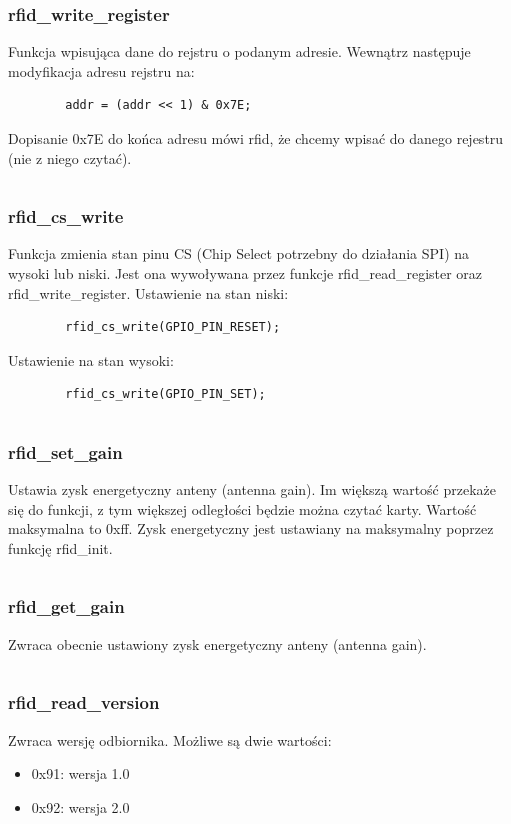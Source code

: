 \documentclass[12pt,hidelinks]{article}
\begin{document}
    \subsubsection{rfid\_write\_register}
    Funkcja wpisująca dane do rejstru o podanym adresie. Wewnątrz następuje modyfikacja adresu rejstru na:
    \begin{verbatim}
        addr = (addr << 1) & 0x7E;
    \end{verbatim}
    Dopisanie 0x7E do końca adresu mówi rfid, że chcemy wpisać do danego rejestru (nie z niego czytać).
    \inputminted[linenos=true]{c++}{rfid_code/rfid_write_register.c}



    \subsubsection{rfid\_cs\_write}
    Funkcja zmienia stan pinu CS (Chip Select potrzebny do działania SPI) na wysoki lub niski. Jest ona wywoływana przez funkcje rfid\_read\_register oraz rfid\_write\_register. \newline
    Ustawienie na stan niski:
    \begin{verbatim}
        rfid_cs_write(GPIO_PIN_RESET);
    \end{verbatim}
    Ustawienie na stan wysoki:
    \begin{verbatim}
        rfid_cs_write(GPIO_PIN_SET);
    \end{verbatim}
    \inputminted[linenos=true]{c++}{rfid_code/rfid_cs_write.c}

    \subsubsection{rfid\_set\_gain}
    Ustawia zysk energetyczny anteny (antenna gain). Im większą wartość przekaże się do funkcji, z tym większej odległości będzie można czytać karty. Wartość maksymalna to 0xff. Zysk energetyczny jest ustawiany na maksymalny poprzez funkcję rfid\_init.
    \inputminted[linenos=true]{c++}{rfid_code/rfid_set_gain.c}

    \subsubsection{rfid\_get\_gain}
    Zwraca obecnie ustawiony zysk energetyczny anteny (antenna gain).
    \inputminted[linenos=true]{c++}{rfid_code/rfid_get_gain.c}


    \subsubsection{rfid\_read\_version}
    Zwraca wersję odbiornika. Możliwe są dwie wartości:
    \begin{itemize}
        \item 0x91: wersja 1.0
        \item 0x92: wersja 2.0
    \end{itemize}
    \inputminted[linenos=true]{c++}{rfid_code/rfid_read_version.c}
\end{document}
